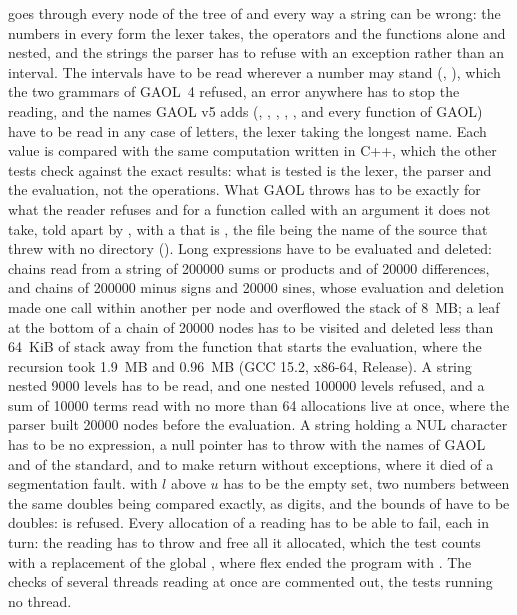 \documentclass[12pt,a4paper,twoside,openright]{book}
\begin{document}
 goes through every node of the tree of
 and every way a string can be wrong:
the numbers in every form the lexer takes, the operators and the functions
alone and nested, and the strings the parser has to refuse with an exception
rather than an interval. The intervals have to be read wherever a number may
stand (, \code{[cos([0,1]), 2]}), which the two grammars of
GAOL~4 refused, an error anywhere has to stop the reading, and the names
GAOL v5 adds (, , , ,
, and every function of GAOL) have to be read in any case of
letters, the lexer taking the longest name.\newinvfive{} Each value is
compared with the same computation written in C++, which the other tests
check against the exact results: what is tested is the lexer, the parser
and the evaluation, not the operations. What GAOL throws has to be exactly
 for what the reader refuses and
 for a function called with an argument it does
not take, told apart by , with a  that is
, the file being the name of the source that
threw with no directory ().\newinvfive{} Long
expressions have to be evaluated and deleted: chains read from a string of
200000 sums or products and of 20000 differences, and chains of 200000
minus signs and 20000 sines, whose evaluation and deletion made one call
within another per node and overflowed the stack of 8~MB; a leaf at the
bottom of a chain of 20000 nodes has to be visited and deleted less than
64~KiB of stack away from the function that starts the evaluation, where the
recursion took 1.9~MB and 0.96~MB (GCC 15.2, x86-64, Release). A string
nested 9000 levels has to be read, and one nested 100000 levels refused, and
a sum of 10000 terms read with no more than 64 allocations live at once,
where the parser built 20000 nodes before the evaluation.\newinvfive{} A
string holding a NUL character has to be no expression, a null pointer has
to throw  with the names of GAOL and of the
standard, and to make  return  without
exceptions, where it died of a segmentation fault. \code{[l, u]} with $l$
above $u$ has to be the empty set, two numbers between the same doubles
being compared exactly, as digits, and the bounds of  have to
be doubles:  is refused.\newinvfive{}
Every allocation of a reading has to be able to fail, each in turn: the
reading has to throw  and free all it allocated,
which the test counts with a replacement of the global ,
where flex ended the program with . The checks of several
threads reading at once are commented out, the tests running no thread.
\end{document}
